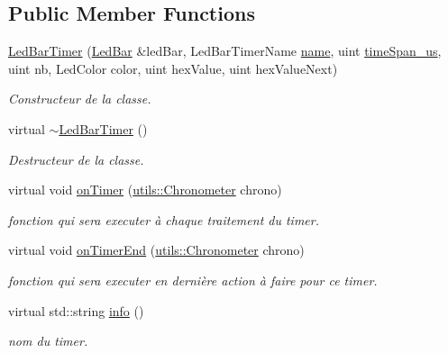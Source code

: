 \subsection*{Public Member Functions}
\begin{DoxyCompactItemize}
\item 
\hyperlink{classLedBarTimer_a638a87499a35e7ce5e2423bb0696374a}{Led\+Bar\+Timer} (\hyperlink{classLedBar}{Led\+Bar} \&led\+Bar, Led\+Bar\+Timer\+Name \hyperlink{classITimerPosixListener_a56abc90e01e315320b855399b2c0096e}{name}, uint \hyperlink{classITimerPosixListener_a68a996ffa95155e824dec8653fbc8e40}{time\+Span\+\_\+us}, uint nb, Led\+Color color, uint hex\+Value, uint hex\+Value\+Next)
\begin{DoxyCompactList}\small\item\em Constructeur de la classe. \end{DoxyCompactList}\item 
\mbox{\label{classLedBarTimer_ab27ba0f3d359d6b8a3d3f266eebeb0e1}} 
virtual \hyperlink{classLedBarTimer_ab27ba0f3d359d6b8a3d3f266eebeb0e1}{$\sim$\+Led\+Bar\+Timer} ()
\begin{DoxyCompactList}\small\item\em Destructeur de la classe. \end{DoxyCompactList}\item 
\mbox{\label{classLedBarTimer_a508f0c79e394a111d211f457fd589870}} 
virtual void \hyperlink{classLedBarTimer_a508f0c79e394a111d211f457fd589870}{on\+Timer} (\hyperlink{classutils_1_1Chronometer}{utils\+::\+Chronometer} chrono)
\begin{DoxyCompactList}\small\item\em fonction qui sera executer à chaque traitement du timer. \end{DoxyCompactList}\item 
\mbox{\label{classLedBarTimer_a7836430e649650253638c3c1c95d20ad}} 
virtual void \hyperlink{classLedBarTimer_a7836430e649650253638c3c1c95d20ad}{on\+Timer\+End} (\hyperlink{classutils_1_1Chronometer}{utils\+::\+Chronometer} chrono)
\begin{DoxyCompactList}\small\item\em fonction qui sera executer en dernière action à faire pour ce timer. \end{DoxyCompactList}\item 
\mbox{\label{classLedBarTimer_aac6060f16bfc4fac7aba78c0463c24bf}} 
virtual std\+::string \hyperlink{classLedBarTimer_aac6060f16bfc4fac7aba78c0463c24bf}{info} ()
\begin{DoxyCompactList}\small\item\em nom du timer. \end{DoxyCompactList}\end{DoxyCompactItemize}
